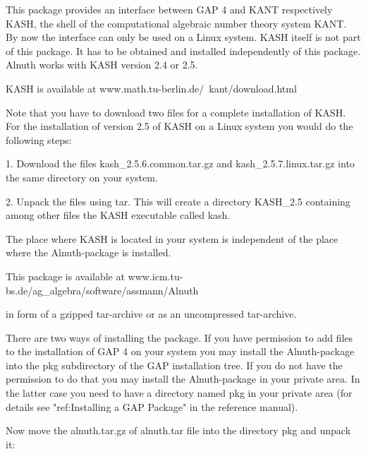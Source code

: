 

This package provides an interface between GAP 4 and KANT respectively
KASH, the shell of the computational algebraic number theory system KANT. By
now the interface can only be used on a Linux system.  KASH itself is not part
of this package.  It has to be obtained and installed independently of this
package. Alnuth works with KASH version 2.4 or 2.5.

 
KASH is available at
\begintt 
            www.math.tu-berlin.de/~kant/download.html
\endtt
 
Note that you have to download two files for a complete installation
of KASH. For the installation of version 2.5 of KASH on a Linux
system you would do the following steps:
\beginlist
\item{1.} Download the files
    kash_2.5.6.common.tar.gz and kash_2.5.7.linux.tar.gz
    into the same directory on your system.
 
\item{2.} Unpack the files using tar.  This will create a directory
    KASH_2.5 containing among other files the KASH executable called
    kash.

\endlist

The place where KASH is located in your system is independent of the place
 where the Alnuth-package is installed.

 
This package is available at
\begintt 
           www.icm.tu-bs.de/ag_algebra/software/assmann/Alnuth
\endtt 

in form of a gzipped tar-archive or as an uncompressed tar-archive.
 
There are two ways of installing the package.  If you have permission
to add files to the installation of GAP 4 on your system you may
install the Alnuth-package into the pkg subdirectory of the GAP
installation tree.  If you do not have the permission to do that you
may install the Alnuth-package in your private area. In the latter case you
need to have a directory named pkg in your private area (for details see
"ref:Installing a GAP Package" in the reference manual). 

Now move the alnuth.tar.gz of alnuth.tar file into the directory pkg and
unpack it:

